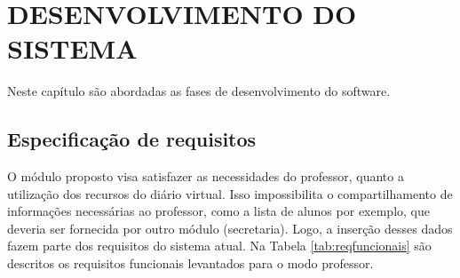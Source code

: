 \chapter{DESENVOLVIMENTO DO SISTEMA}
\label{cap:sistema}	

Neste capítulo são abordadas as fases de desenvolvimento do software.

\section{Especificação de requisitos}


O módulo proposto visa satisfazer as necessidades do professor, quanto a utilização dos recursos do diário virtual. Isso impossibilita o compartilhamento de informações necessárias ao professor, como a lista de alunos por exemplo, que deveria ser fornecida por outro módulo (secretaria). Logo, a inserção desses dados fazem parte dos requisitos do sistema atual. Na Tabela \ref{tab:reqfuncionais} são descritos os requisitos funcionais levantados para o modo professor.


